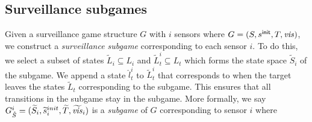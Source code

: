 \subsection{Surveillance subgames}
Given a surveillance game structure $G$ with $i$ sensors where $G = (S,s^{\mathsf{init}},T,\mathit{vis})$, we construct a \emph{surveillance subgame} corresponding to each sensor $i$. To do this, we select a subset of states $\widetilde{L}_i \subseteq L_i$ and $\widetilde{L}^i_t \subseteq L_t$ which forms the state space $\widetilde{S}_i$ of the subgame. We append a state $\hat{l}^i_t$ to $\widetilde{L}^i_t$ that corresponds to when the target leaves the states $\widetilde{L}_t$ corresponding to the subgame. This ensures that all transitions in the subgame stay in the subgame. More formally, we say $G^{i}_{\hat{S}} = (\widetilde{S}_i,\widetilde{s}_i^{init},\widetilde{T},\widetilde{\mathit{vis}}_i)$ is a \emph{subgame} of $G$ corresponding to sensor $i$ where 

